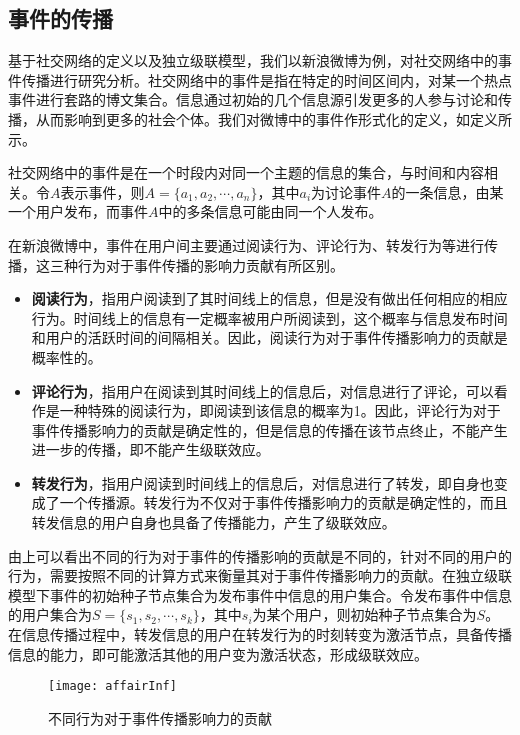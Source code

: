 \subsection{事件的传播}
\label{subsec5:affair}
基于社交网络的定义以及独立级联模型，我们以新浪微博为例，对社交网络中的事件传播进行研究分析。社交网络中的事件是指在特定的时间区间内，对某一个热点事件进行套路的博文集合。信息通过初始的几个信息源引发更多的人参与讨论和传播，从而影响到更多的社会个体。我们对微博中的事件作形式化的定义，如定义所示。

\begin{mydef}[事件]
\label{def:event}
社交网络中的事件是在一个时段内对同一个主题的信息的集合，与时间和内容相关。令$A$表示事件，则$A=\{a_1, a_2, \cdots, a_n\}$，其中$a_i$为讨论事件$A$的一条信息，由某一个用户发布，而事件$A$中的多条信息可能由同一个人发布。
\end{mydef}

在新浪微博中，事件在用户间主要通过阅读行为、评论行为、转发行为等进行传播，这三种行为对于事件传播的影响力贡献有所区别。
\begin{itemize}
  \item \textbf{阅读行为}，指用户阅读到了其时间线上的信息，但是没有做出任何相应的相应行为。时间线上的信息有一定概率被用户所阅读到，这个概率与信息发布时间和用户的活跃时间的间隔相关。因此，阅读行为对于事件传播影响力的贡献是概率性的。
  \item \textbf{评论行为}，指用户在阅读到其时间线上的信息后，对信息进行了评论，可以看作是一种特殊的阅读行为，即阅读到该信息的概率为1。因此，评论行为对于事件传播影响力的贡献是确定性的，但是信息的传播在该节点终止，不能产生进一步的传播，即不能产生级联效应。
  \item \textbf{转发行为}，指用户阅读到时间线上的信息后，对信息进行了转发，即自身也变成了一个传播源。转发行为不仅对于事件传播影响力的贡献是确定性的，而且转发信息的用户自身也具备了传播能力，产生了级联效应。
\end{itemize}

由上可以看出不同的行为对于事件的传播影响的贡献是不同的，针对不同的用户的行为，需要按照不同的计算方式来衡量其对于事件传播影响力的贡献。在独立级联模型下事件的初始种子节点集合为发布事件中信息的用户集合。令发布事件中信息的用户集合为$S=\{s_1,s_2,\cdots,s_k\}$，其中$s_i$为某个用户，则初始种子节点集合为$S$。在信息传播过程中，转发信息的用户在转发行为的时刻转变为激活节点，具备传播信息的能力，即可能激活其他的用户变为激活状态，形成级联效应。

\begin{figure}[!ht]
    \centering
    \texttt{[image: affairInf]}
    \caption{不同行为对于事件传播影响力的贡献}
    \label{fig:affairInf}
\end{figure}

